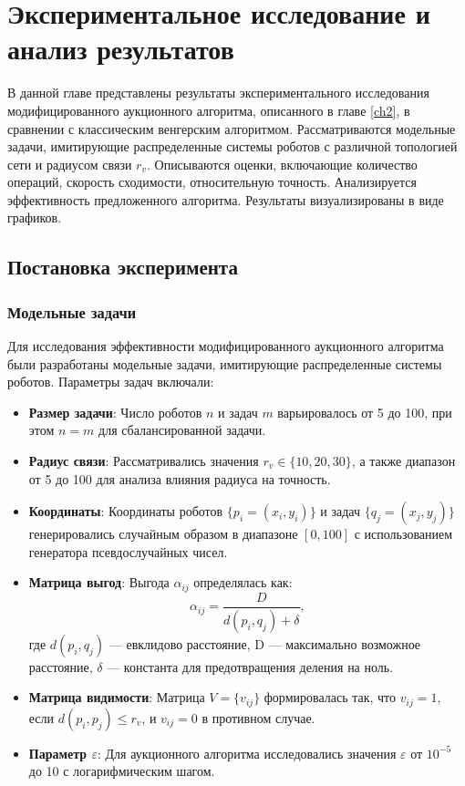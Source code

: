 \chapter{Экспериментальное исследование и анализ результатов}
\label{ch4}

\vspace{0.5cm}

В данной главе представлены результаты экспериментального исследования модифицированного аукционного алгоритма, описанного в главе \ref{ch2}, в сравнении с классическим венгерским алгоритмом. Рассматриваются модельные задачи, имитирующие распределенные системы роботов с различной топологией сети и радиусом связи \( r_v \). Описываются оценки, включающие количество операций, скорость сходимости, относительную точность. Анализируется эффективность предложенного алгоритма. Результаты визуализированы в виде графиков.

\section{Постановка эксперимента}

\subsection{Модельные задачи}

\vspace{0.3cm}

Для исследования эффективности модифицированного аукционного алгоритма были разработаны модельные задачи, имитирующие распределенные системы роботов. Параметры задач включали:

\begin{itemize}
    \item \textbf{Размер задачи}: Число роботов \( n \) и задач \( m \) варьировалось от 5 до 100, при этом \( n = m \) для сбалансированной задачи.
    \item \textbf{Радиус связи}: Рассматривались значения \( r_v \in \{10, 20, 30\} \), а также диапазон от 5 до 100 для анализа влияния радиуса на точность.
    \item \textbf{Координаты}: Координаты роботов \( \{p_i = (x_i, y_i)\} \) и задач \( \{q_j = (x_j, y_j)\} \) генерировались случайным образом в диапазоне \( [0, 100] \) с использованием генератора псевдослучайных чисел.
    \item \textbf{Матрица выгод}: Выгода \( \alpha_{ij} \) определялась как:
    \[
    \alpha_{ij} = \frac{D}{d(p_i, q_j) + \delta},
    \]
    где \( d(p_i, q_j) \) --- евклидово расстояние, D --- максимально возможное расстояние, \( \delta \) --- константа для предотвращения деления на ноль.
    \item \textbf{Матрица видимости}: Матрица \( V = \{v_{ij}\} \) формировалась так, что \( v_{ij} = 1 \), если \( d(p_i, p_j) \leq r_v \), и \( v_{ij} = 0 \) в противном случае.
    \item \textbf{Параметр \( \varepsilon \)}: Для аукционного алгоритма исследовались значения \( \varepsilon \) от \( 10^{-5} \) до 10 с логарифмическим шагом.
\end{itemize}

